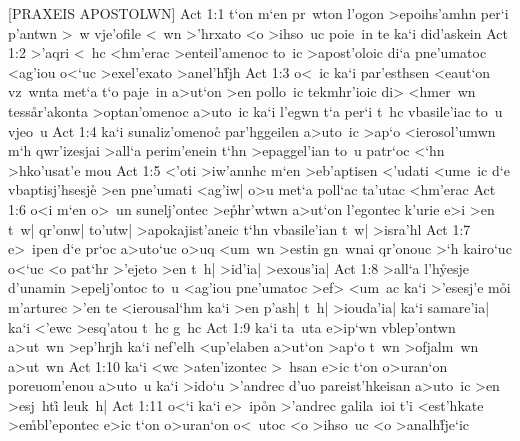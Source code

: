 [PRAXEIS APOSTOLWN]
\vs Act 1:1
t`on
m`en
pr~wton
l'ogon
>epoihs'amhn
per`i
p'antwn
>~w
vje'ofile
<~wn
>'hrxato
<o
>ihso~uc
poie~in
te
ka`i
did'askein\bibvsend
\vs Act 1:2
>'aqri
<~hc
<hm'erac
>enteil'amenoc
to~ic
>apost'oloic
di`a
pne'umatoc
<ag'iou
o<`uc
>exel'exato
>anel'h\r{f}jh\bibvsend
{}
\vs Act 1:3
o<~ic
ka`i
par'esthsen
<eaut`on
vz~wnta
met`a
t`o
paje~in
a>ut`on
>en
pollo~ic
tekmhr'ioic
di>
<hmer~wn
tess\r{a}r'akonta
>optan'omenoc
a>uto~ic
ka`i
l'egwn
t`a
per`i
t~hc
vbasile'iac
to~u
vjeo~u\bibvsend
\vs Act 1:4
ka`i
sunaliz'omeno\r{c}
par'hggeilen
a>uto~ic
>ap`o
<ierosol'umwn
m`h
qwr'izesjai
>all`a
perim'enein
t`hn
>epaggel'ian
to~u
patr`oc
<`hn
>hko'usat'e
mou\bibvsend
\vs Act 1:5
<'oti
>iw'annhc
m`en
>eb'aptisen
<'udati
<ume~ic
d`e
vbaptisj'hsesje\r{}
>en
pne'umati
<ag'iw|
o>u
met`a
poll`ac
ta'utac
<hm'erac\bibvsend
\vs Act 1:6
o<i
m`en
o>~un
sunelj'ontec
>e\r{p}hr'wtwn
a>ut`on
l'egontec
k'urie
e>i
>en
t~w|
qr'onw|
to'utw|
>apokajist'aneic
t`hn
vbasile'ian
t~w|
>isra'hl\bibvsend
\vs Act 1:7
e>~ipen
d`e
pr`oc
a>uto`uc
o>uq
<um~wn
>estin
gn~wnai
qr'onouc
>`h
kairo`uc
o<`uc
<o
pat`hr
>'ejeto
>en
t~h|
>id'ia|
>exous'ia|\bibvsend
\vs Act 1:8
>all`a
l'h\r{y}esje
d'unamin
>epelj'ontoc
to~u
<ag'iou
pne'umatoc
>ef>
<um~ac
ka`i
>'esesj'e
m\r{o}i
m'arturec
>'en
te
<ierousal`hm
ka`i
>en
p'ash|
t~h|
>iouda'ia|
ka`i
samare'ia|
ka`i
<'ewc
>esq'atou
t~hc
g~hc\bibvsend
\vs Act 1:9
ka`i
ta~uta
e>ip`wn
vblep'ontwn
a>ut~wn
>ep'hrjh
ka`i
nef'elh
<up'elaben
a>ut`on
>ap`o
t~wn
>ofjalm~wn
a>ut~wn\bibvsend
\vs Act 1:10
ka`i
<wc
>aten'izontec
>~hsan
e>ic
t`on
o>uran`on
poreuom'enou
a>uto~u
ka`i
>ido`u
>'andrec
d'uo
pareist'hkeisan
a>uto~ic
>en
>esj~hti\r{}
leuk~h|\bibvsend
\vs Act 1:11
o<`i
ka`i
e>~ip\r{o}n
>'andrec
galila~ioi
t'i
<est'hkate
>e\r{m}bl'epontec
e>ic
t`on
o>uran`on
o<~utoc
<o
>ihso~uc
<o
>analh\r{f}je`ic
